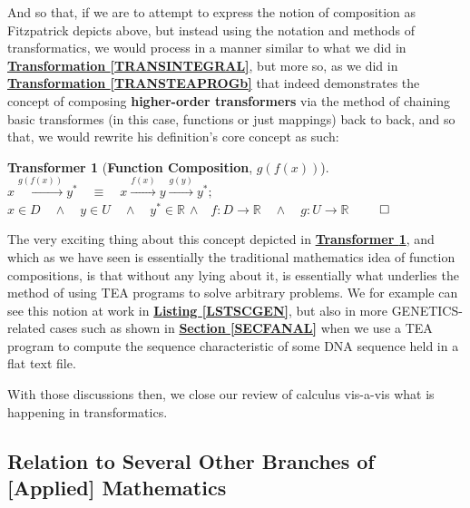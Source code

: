 \documentclass[a4paper, 18pt]{book} %
\newtheorem{transf}{Transformer}
\begin{document}
\begin{appendices}
\vspace{2em}

And so that, if we are to attempt to express the notion of composition as Fitzpatrick depicts above, but instead using the notation and methods of transformatics, we would process in a manner similar to what we did in \textbf{\hyperref[TRANSINTEGRAL]{Transformation \ref{TRANSINTEGRAL}}}, but more so, as we did in \textbf{\hyperref[TRANSTEAPROGb]{Transformation \ref{TRANSTEAPROGb}}} that indeed demonstrates the concept of composing \textbf{higher-order transformers} via the method of chaining basic transformes (in this case, functions or just mappings) back to back, and so that, we would rewrite his definition's core concept as such:


\begin{transf}[\textbf{Function Composition}, $g(f(x))$]
\label{TRANSFFUNCOMPOS}
$ $\\
$ x \xrightarrow{g(f(x))} y^* \quad \equiv \quad x \xrightarrow{f(x)} y  \xrightarrow{g(y)} y^*;$\\
$x \in D \quad \land \quad y \in U \quad \land \quad y^* \in \mathbb{R}$
$\land \quad f:D \rightarrow \mathbb{R} \quad \land \quad g:U \rightarrow \mathbb{R}$
$\qed$
\end{transf}


\vspace{2em}

The very exciting thing about this concept depicted in \textbf{\hyperref[TRANSFFUNCOMPOS]{Transformer \ref{TRANSFFUNCOMPOS}}}, and which as we have seen is essentially the traditional mathematics idea of function compositions, is that without any lying about it, is essentially what underlies the method of using TEA programs to solve arbitrary problems. We for example can see this notion at work in \textbf{\hyperref[LSTSCGEN]{Listing \ref{LSTSCGEN}}}, but also in more GENETICS-related cases such as shown in \textbf{\hyperref[SECFANAL]{Section \ref{SECFANAL}}} when we use a TEA program to compute the sequence characteristic of some DNA sequence held in a flat text file.

\vspace{2em}


With those discussions then, we close our review of calculus vis-a-vis what is happening in transformatics.

\vspace{2em}


\subsection{Relation to Several Other Branches of [Applied] Mathematics}



\end{appendices}
\end{document}

